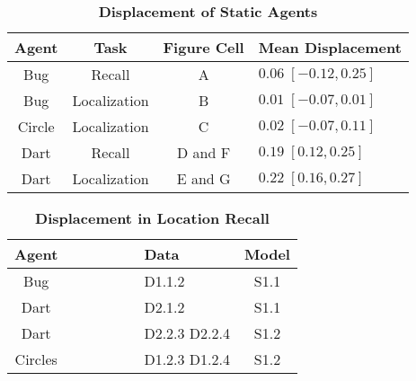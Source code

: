 \documentclass[10pt]{article}
\begin{document}
\begin{table}[!ht]
\caption{
\bf{Displacement of Static Agents}}
\begin{tabular}{|c|c|c|l|}
\hline
Agent & Task & Figure Cell & Mean Displacement\\
\hline
Bug & Recall & A & $0.06 \; [-0.12,0.25]$ \\
\hline
Bug & Localization & B & $0.01 \; [-0.07,0.01]$ \\
\hline
Circle & Localization & C & $0.02 \; [-0.07,0.11]$ \\
\hline
Dart & Recall & D and F & $0.19 \; [0.12,0.25]$ \\
\hline
Dart & Localization & E and G & $0.22 \; [0.16,0.27]$ \\
\hline
\end{tabular}
\begin{flushleft}
\end{flushleft}
\label{tab:b5}
\end{table}

\begin{table}[!ht]
\caption{
\bf{Displacement in Location Recall}}
\begin{tabular}{|c|p{1.7cm}|p{1.7cm}|p{1.7cm}|p{1.7cm}|p{1.5cm}|p{1cm}|c|}
\hline
Agent & \centering{Gravity} & \centering{Momentum} & \centering{Lazy Hand} & \centering{Orientation} & \centering{Slope} & Data & Model\\
\hline
Bug & \centering{$0.01$ $[-0.21,0.22]$}& \centering{$-0.02$ $[-0.15,0.1]$}& \centering{$0.24$ $[-0.04,0.5]$} & \centering{$0.14$ $[0.01,0.27]$}& \centering{-} & D1.1.2 & S1.1\\
\hline
Dart & \centering{*} & \centering{$0.04$ $[-0.06,0.14]$} & \centering{$0.38 $ $[0.2,0.53]$} & \centering{$0.12$ $[0.03,0.2]$} & \centering{-} & D2.1.2 & S1.1\\
\hline
Dart & \centering{*} & \centering{$0.02$ $[-0.05,0.09]$}& \centering{$0.49$ $[0.32,0.65]$}& \centering{$0.13$ $[0.05,0.21]$}& \centering{$1.02$ $[0.79,1.24]$} & D2.2.3 D2.2.4 & S1.2\\
\hline
Circles & \centering{$-0.01$ $[-0.18,0.16]$} & \centering{$0$ $[-0.09,0.1]$}& \centering{$0.37$ $[0.15,0.61]$}& \centering{$0.02$ $[-0.11,0.15]$}& \centering{$1.2$ $[0.39,1.9]$} & D1.2.3 D1.2.4 & S1.2\\
\hline
\end{tabular}
\begin{flushleft}
\end{flushleft}
\label{tab:recall}
\end{table}
\end{document}
